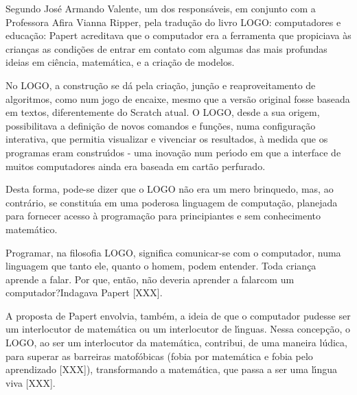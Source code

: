 \documentclass[
12pt,		%
openright,	%
twoside,  %
a4paper,			%
chapter=TITLE,		%
english,			%
french,				%
spanish,			%
brazil				%
]{USPSC-classe/USPSC_RedarTex}
\begin{document}
Segundo Jos\'e Armando Valente, um dos respons\'aveis, em conjunto com a Professora Afira Vianna Ripper, pela tradu\c{c}\~ao do livro LOGO: computadores e educa\c{c}\~ao: \textquotedbl Papert acreditava que o computador era a ferramenta que propiciava \`as crian\c{c}as as condi\c{c}\~oes de entrar em contato com algumas das mais profundas ideias em ci\^encia, matem\'atica, e a cria\c{c}\~ao de modelos\textquotedbl .










No LOGO, a constru\c{c}\~ao se d\'a pela cria\c{c}\~ao, jun\c{c}\~ao e reaproveitamento de algoritmos, como num jogo de encaixe, mesmo que a vers\~ao original fosse baseada em textos, diferentemente do Scratch atual. O LOGO, desde a sua origem, possibilitava a defini\c{c}\~ao de novos comandos e fun\c{c}\~oes, numa configura\c{c}\~ao interativa, que permitia visualizar e vivenciar os resultados, \`a medida que os programas eram constru\'{\i}dos  - uma inova\c{c}\~ao num per\'{\i}odo em que a interface de muitos computadores ainda era baseada em cart\~ao perfurado.










Desta forma, pode-se dizer que o LOGO n\~ao era um mero brinquedo, mas, ao contr\'ario, se constitu\'{\i}a em uma poderosa linguagem de computa\c{c}\~ao, planejada para fornecer acesso \`a programa\c{c}\~ao para principiantes e sem conhecimento matem\'atico.










Programar, na filosofia LOGO, significa \textquotedbl comunicar-se com o computador, numa linguagem que tanto ele, quanto o homem,  podem entender\textquotedbl . Toda crian\c{c}a aprende a falar. Por que, ent\~ao, n\~ao deveria aprender a \textquotedbl falar\textquotedbl  com um computador?\textquotedbl  Indagava Papert [XXX].










A proposta de Papert envolvia, tamb\'em, a ideia de que o computador pudesse ser um interlocutor  de matem\'atica ou um interlocutor de l\'{\i}nguas. Nessa concep\c{c}\~ao, o LOGO, ao ser um interlocutor da matem\'atica, contribui, de uma maneira l\'udica, para superar as barreiras matof\'obicas (fobia por matem\'atica e fobia pelo aprendizado [XXX]), transformando a matem\'atica, que passa a ser uma l\'{\i}ngua viva [XXX].
\end{document}
